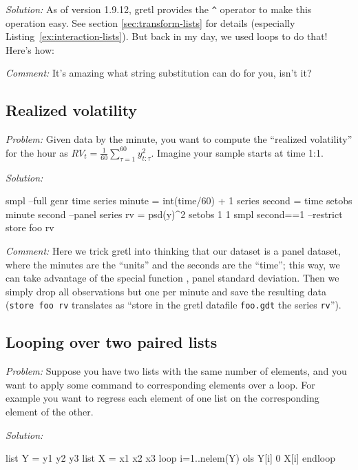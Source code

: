 \emph{Solution:} As of version 1.9.12, gretl provides the
\verb|^| operator to make this operation easy. See section
\ref{sec:transform-lists} for details (especially
Listing~\ref{ex:interaction-lists}). But back in my day,
we used loops to do that! Here's how:


\emph{Comment:} It's amazing what string substitution can do for
you, isn't it?

\subsection{Realized volatility}

\emph{Problem:} Given data by the minute, you want to compute the
``realized volatility'' for the hour as $RV_t = 
\sum_{}^{60} y_{t:\tau}^2$. Imagine your sample starts at time 1:1.

\emph{Solution:}
\begin{code}
smpl --full
genr time
series minute = int(time/60) + 1
series second = time %
setobs minute second --panel
series rv = psd(y)^2
setobs 1 1
smpl second==1 --restrict
store foo rv
\end{code}

\emph{Comment:} Here we trick gretl into thinking that our
dataset is a panel dataset, where the minutes are the ``units'' and
the seconds are the ``time''; this way, we can take advantage of the
special function , panel standard deviation.  Then we
simply drop all observations but one per minute and save the resulting
data (\texttt{store foo rv} translates as ``store in the gretl
datafile \texttt{foo.gdt} the series \texttt{rv}'').

\subsection{Looping over two paired lists}

\emph{Problem:} Suppose you have two lists with the same number of
elements, and you want to apply some command to corresponding elements
over a loop. For example you want to regress each element of one
list on the corresponding element of the other.

\emph{Solution:}
\begin{code}
list Y = y1 y2 y3
list X = x1 x2 x3
loop i=1..nelem(Y)
   ols Y[i] 0 X[i]
endloop
\end{code}


